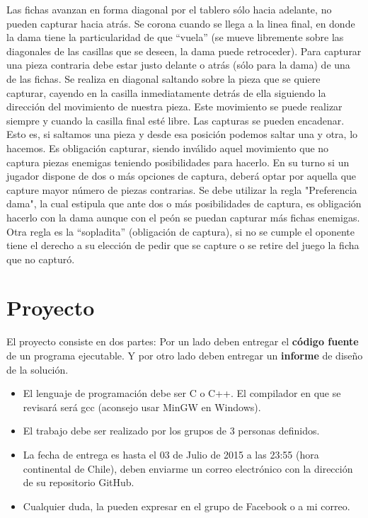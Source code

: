 \documentclass[a4paper,10pt]{article}
\begin{document}
Las fichas avanzan en forma diagonal por el tablero sólo hacia adelante, no pueden capturar hacia atrás. Se corona cuando se llega a la linea final, en donde  la dama tiene la particularidad de que ``vuela'' (se mueve libremente sobre las diagonales de las casillas que se deseen, la dama puede retroceder).
\newline
Para capturar una pieza contraria debe estar justo delante o atrás (sólo para la dama) de una de las fichas. Se realiza en diagonal saltando sobre la pieza que se quiere capturar, cayendo en la casilla inmediatamente detrás de ella siguiendo la dirección del movimiento de nuestra pieza. Este movimiento se puede realizar siempre y cuando la casilla final esté libre. Las capturas se pueden encadenar. Esto es, si saltamos una pieza y desde esa posición podemos saltar una y otra, lo hacemos. Es obligación capturar, siendo inválido aquel movimiento que no captura piezas enemigas teniendo posibilidades para hacerlo. En su turno si un jugador dispone de dos o más opciones de captura, deberá optar por aquella que capture mayor número de piezas contrarias.
\newline
Se debe utilizar la regla "Preferencia dama", la cual estipula que ante dos o más posibilidades de captura, es obligación hacerlo con la dama aunque con el peón se puedan capturar más fichas enemigas. 
\newline
Otra regla es la ``sopladita'' (obligación de captura), si no se cumple el oponente tiene el derecho a su elección de pedir que se capture o se retire del juego la ficha que no capturó.



\section{Proyecto}

El proyecto consiste en dos partes:
\newline
Por un lado deben entregar el {\bf código fuente} de un programa ejecutable. Y por otro lado deben entregar un {\bf informe} de diseño de la solución.


\begin{itemize}
 \item El lenguaje de programación debe ser C o C++. El compilador en que se revisará será gcc (aconsejo usar MinGW en Windows).
 \item El trabajo debe ser realizado por los grupos de 3 personas definidos.
 \item La fecha de entrega es hasta el 03 de Julio de 2015 a las 23:55 (hora continental de Chile), deben enviarme un correo electrónico con la dirección de su repositorio GitHub.
 \item Cualquier duda, la pueden expresar en el grupo de Facebook o a mi correo.
\end{itemize}
\end{document}
